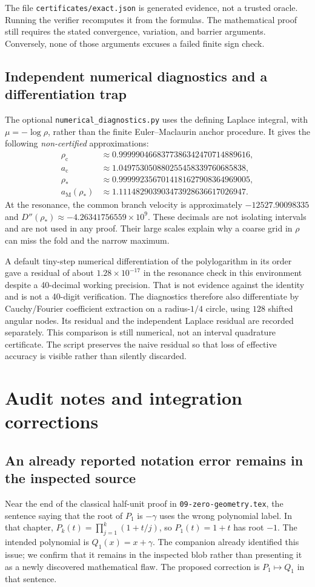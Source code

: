 \documentclass[11pt]{article}
\numberwithin{equation}{section}
\theoremstyle{definition}
\newcommand{\lc}{\rho_{\mathrm c}}
\newcommand{\rs}{\rho_*}
\newcommand{\ac}{a_{\mathrm c}}
\newcommand{\aM}{a_{\mathrm M}}
\begin{document}
The file \texttt{certificates/exact.json} is generated evidence, not a
trusted oracle. Running the verifier recomputes it from the formulas.
The mathematical proof still requires the stated convergence, variation,
and barrier arguments. Conversely, none of those arguments excuses a
failed finite sign check.

\subsection{Independent numerical diagnostics and a differentiation trap}
The optional \texttt{numerical\_diagnostics.py} uses the defining Laplace
integral, with $\mu=-\log\rho$, rather than the finite Euler--Maclaurin
anchor procedure. It gives the following \emph{non-certified} approximations:
\begin{align*}
 \lc&\approx0.9999904668377386342470714889616,\\
 \ac&\approx1.049753050880255458339760685838,\\
 \rs&\approx0.9999923567014181627908364969005,\\
 \aM(\rs)&\approx1.111482903903473928636617026947.
\end{align*}
At the resonance, the common branch velocity is approximately
$-12527.90098335$ and $D''(\rs)\approx-4.26341756559\times10^9$.
These decimals are not isolating intervals and are not used in any proof.
Their large scales explain why a coarse grid in $\rho$ can miss the fold
and the narrow maximum.

A default tiny-step numerical differentiation of the polylogarithm in its
order gave a residual of about $1.28\times10^{-17}$ in the resonance check
in this environment despite a 40-decimal working precision. That is not
evidence against the identity and is not a 40-digit verification.
The diagnostics therefore also differentiate by Cauchy/Fourier coefficient
extraction on a radius-$1/4$ circle, using $128$ shifted angular nodes.
Its residual and the independent Laplace residual are recorded separately.
This comparison is still numerical, not an interval quadrature certificate.
The script preserves the naive residual so that loss of effective accuracy
is visible rather than silently discarded.

\section{Audit notes and integration corrections}
\label{sec:audit}
\subsection{An already reported notation error remains in the inspected source}
Near the end of the classical half-unit proof in
\texttt{09-zero-geometry.tex}, the sentence saying that the root of $P_1$
is $-\gamma$ uses the wrong polynomial label. In that chapter,
$P_k(t)=\prod_{j=1}^k(1+t/j)$, so $P_1(t)=1+t$ has root $-1$.
The intended polynomial is $Q_1(x)=x+\gamma$. The companion already
identified this issue; we confirm that it remains in the inspected blob
rather than presenting it as a newly discovered mathematical flaw.
The proposed correction is $P_1\mapsto Q_1$ in that sentence.
\end{document}
